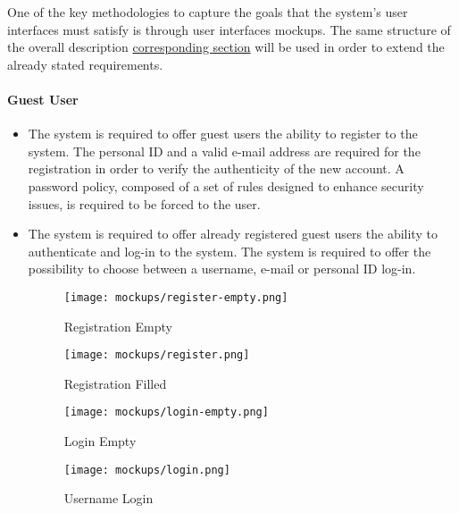 	One of the key methodologies to capture the goals that the system's user interfaces must satisfy is through user interfaces mockups. The same structure of the overall description \hyperref[sec:goals]{corresponding section} will be used in order to extend the already stated requirements.

 \paragraph{Guest User}

	\begin{itemize}
		\item The system is required to offer guest users the ability to register to the system. The personal ID and a valid e-mail address are required for the registration in order to verify the authenticity of the new account. A password policy, composed of a set of rules designed to enhance security issues, is required to be forced to the user.
				
		\item The system is required to offer already registered guest users the ability to authenticate and log-in to the system. The system is required to offer the possibility to choose between a username, e-mail or personal ID log-in. \newline\newline
			
			\begin{figure}[h]
  				\centering
  				\begin{minipage}[b]{0.4\textwidth}
    				\texttt{[image: mockups/register-empty.png]}
    					\caption{Registration Empty}
  				\end{minipage}
  				\hfill
  				\begin{minipage}[b]{0.4\textwidth}
    				\texttt{[image: mockups/register.png]}
    				\caption{Registration Filled}
  				\end{minipage}
			\end{figure}
		
			\begin{figure}[h]
  				\centering
  				\begin{minipage}[b]{0.4\textwidth}
    				\texttt{[image: mockups/login-empty.png]}
    					\caption{Login Empty}
  				\end{minipage}
  				\hfill
  				\begin{minipage}[b]{0.4\textwidth}
    				\texttt{[image: mockups/login.png]}
    				\caption{Username Login}
  				\end{minipage}
			\end{figure}
			
	\end{itemize}



